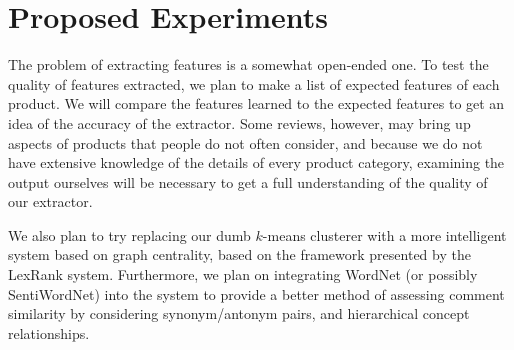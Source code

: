 \documentclass{article}
\begin{document}
\section{Proposed Experiments}
The problem of extracting features is a somewhat open-ended one.  To test the quality of features extracted, we plan to make a list of expected features of each product.  We will compare the features learned to the expected features to get an idea of the accuracy of the extractor. Some reviews, however, may bring up aspects of products that people do not often consider, and because we do not have extensive knowledge of the details of every product category, examining the output ourselves will be necessary to get a full understanding of the quality of our extractor.

We also plan to try replacing our dumb $k$-means clusterer with a more
intelligent system based on graph centrality, based on the framework presented
by the LexRank system. Furthermore, we plan on integrating WordNet (or possibly
SentiWordNet) into the system to provide a better method of assessing comment
similarity by considering synonym/antonym pairs, and hierarchical concept
relationships.

\tocsection


\end{document}
